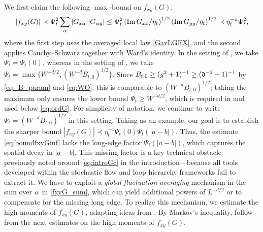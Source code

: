 We first claim the following $\max$-bound on $f_{xy}(G)$:
\begin{align}\label{eq:boundfxyGinf}
    |f_{xy}(G)|\prec \Psi_t^2 \sum_{\alpha}|G_{x\alpha}||G_{\alpha y}| \le \Psi_t^2 \left({{\operatorname{{\mathrm{Im}}} G_{xx}}/{\eta_t}}\right)^{1/2}\left({{\operatorname{{\mathrm{Im}}} G_{yy}}/{\eta_t}}\right)^{1/2}\prec \eta_t^{-1}\Psi_t^2,
\end{align}
where the first step uses the averaged local law \eqref{GavLGEX}, and the second applies Cauchy--Schwarz together with Ward's identity. In the setting of , we take $\Psi_t = \Psi_t(0)$, whereas in the setting of , we take $\Psi_t = \max\{W^{-d/2},(W^{-d}B_{t,0})^{1/2}\}$. Since $B_{t,0}\ge (g^2+1)^{-1}\ge ({\mathfrak d}^{-2}+1)^{-1}$ by \eqref{eq_B_param} and \eqref{eq:WO}, this is comparable to $(W^{-d}B_{t,0})^{1/2}$; taking the maximum only ensures the lower bound $\Psi_t\ge W^{-d/2}$, which is required in  and used below \eqref{eq:ordG}. For simplicity of notation, we continue to write $\Psi_t=(W^{-d}B_{t,0})^{1/2}$ in this setting.
Taking  as an example, our goal is to establish the sharper bound $|f_{xy}(G)|\prec \eta_t^{-1}\Psi_t(0)\Psi_t(|a-b|)$.
Thus, the estimate \eqref{eq:boundfxyGinf} lacks the long-edge factor $\Psi_t(|a-b|)$, which captures the spatial decay in $|a-b|$. This missing factor is a key technical obstacle---previously noted around \eqref{eq:introGc} in the introduction---because all tools developed within the stochastic flow and loop hierarchy frameworks fail to extract it. 
We have to exploit a \emph{global fluctuation averaging} mechanism in the sum over $\alpha$ in \eqref{fxyG_sum}, which can yield additional powers of $L^{-d/2}$ or  to compensate for the missing long edge.
To realize this mechanism, we estimate the high moments of $f_{xy}(G)$, adapting ideas from \cite{yang2021delocalization,yang2022delocalization,yang2021random}.
By Markov's inequality,  follow from the next estimates on the high moments of $f_{xy}(G)$.
